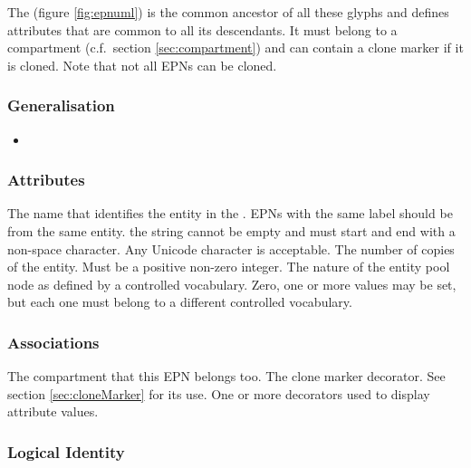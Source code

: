The  (figure \ref{fig:epnuml}) is the common
ancestor of all these glyphs and defines attributes that are common to
all its descendants. It must belong to a compartment (c.f.\, section
\ref{sec:compartment})  and can contain a clone marker if it is
cloned. Note that not all EPNs can be cloned.

\subsubsection{Generalisation}

\begin{itemize}
\item {}
\end{itemize}

\subsubsection{Attributes}

\begin{attributes}
   The name that identifies the entity in the
  \PDm. EPNs with the same label should be from the same entity. the
  string cannot be empty and must start and end with a non-space
  character. Any Unicode character is acceptable.
   The number of copies of the entity. Must
  be a positive non-zero integer.
   The nature of the entity pool node as defined
  by a controlled vocabulary. Zero, one or more values may be set, but
  each one must belong to a different controlled vocabulary.
\end{attributes}

\subsubsection{Associations}

\begin{attributes}
  The compartment
  that this EPN belongs too.
   The clone marker
  decorator. See section \ref{sec:cloneMarker} for its use.
  One or
 more decorators used to display attribute values.
\end{attributes}

\subsubsection{Logical Identity}

